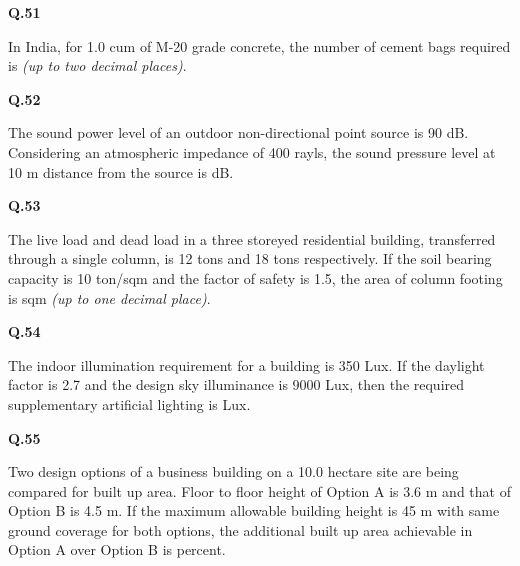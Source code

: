 \documentclass{article}
\begin{document}
\vspace{1.5cm}

\noindent
\textbf{Q.51}\hspace{0.5cm}\parbox[t]{14.5cm}{ In India, for 1.0 cum of M-20 grade concrete, the number of cement bags required is \underline{\hspace{3cm}} \emph{(up to two decimal places)}.}

\vspace{1.5cm}

\noindent
\textbf{Q.52} \hspace{0.5cm}\parbox[t]{14.5cm}{The sound power level of an outdoor non-directional point source is 90 dB. Considering an atmospheric impedance of 400 rayls, the sound pressure level at 10 m distance from the source is \underline{\hspace{3cm}} dB.}

\vspace{1.5cm}

\noindent
\textbf{Q.53}\hspace{0.5cm}\parbox[t]{14.5cm}{ The live load and dead load in a three storeyed residential building, transferred through a single column, is 12 tons and 18 tons respectively. If the soil bearing capacity is 10 ton/sqm and the factor of safety is 1.5, the area of column footing is \underline{\hspace{3cm}} sqm \emph{(up to one decimal place)}.}

\vspace{1.5cm}

\noindent
\textbf{Q.54}\hspace{0.5cm}\parbox[t]{14.5cm}{ The indoor illumination requirement for a building is 350 Lux. If the daylight factor is 2.7 and the design sky illuminance is 9000 Lux, then the required supplementary artificial lighting is \underline{\hspace{3cm}} Lux.}

\vspace{1.5cm}

\noindent
    \textbf{Q.55} \hspace{0.5cm} \parbox[t]{14.5cm}{Two design options of a business building on a 10.0 hectare site are being compared for built up area. Floor to floor height of Option A is 3.6 m and that of Option B is 4.5 m. If the maximum allowable building height is 45 m with same ground coverage for both options, the additional built up area achievable in Option A over Option B is \underline{\hspace{3cm}} percent.}
\end{document}
